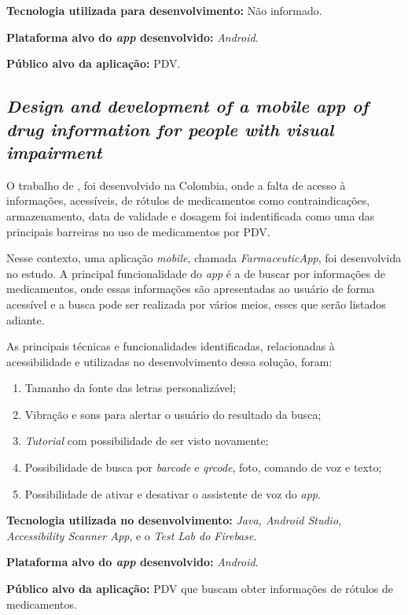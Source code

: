 \textbf{Tecnologia utilizada para desenvolvimento:} Não informado.

\textbf{Plataforma alvo do \emph{app} desenvolvido:} \emph{Android}.

\textbf{Público alvo da aplicação:} PDV\@.

\subsection{\emph{Design and development of a mobile app of drug information for people with visual impairment}}

O trabalho de , foi desenvolvido na Colombia, onde a falta de acesso à informações, acessíveis, de rótulos de medicamentos como contraindicações, armazenamento, data de validade e dosagem foi indentificada como uma das principais barreiras no uso de medicamentos por PDV.

Nesse contexto, uma aplicação \emph{mobile}, chamada \emph{FarmaceuticApp}, foi desenvolvida no estudo.
A principal funcionalidade do \emph{app} é a de buscar por informações de medicamentos, onde essas informações são apresentadas ao usuário de forma acessível e a busca pode ser realizada por vários meios, esses que serão listados adiante.

As principais técnicas e funcionalidades identificadas, relacionadas à acessibilidade e utilizadas no desenvolvimento dessa solução, foram:

\begin{enumerate}
\item Tamanho da fonte das letras personalizável;
\item Vibração e sons para alertar o usuário do resultado da busca;
\item \emph{Tutorial} com possibilidade de ser visto novamente;
\item Possibilidade de busca por \emph{barcode} e \emph{qrcode}, foto, comando de voz e texto;
\item Possibilidade de ativar e desativar o assistente de voz do \emph{app}.
\end{enumerate}

\textbf{Tecnologia utilizada no desenvolvimento:} \emph{Java, Android Studio, Accessibility Scanner App}, e o \emph{Test Lab do Firebase}.

\textbf{Plataforma alvo do \emph{app} desenvolvido:} \emph{Android}.

\textbf{Público alvo da aplicação:} PDV que buscam obter informações de rótulos de medicamentos\@.

